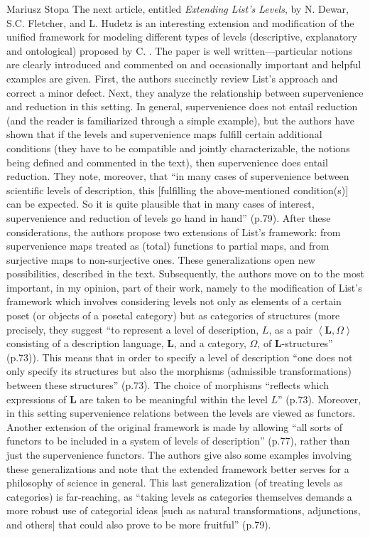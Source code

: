 \begin{recengenv}{Mariusz Stopa}
\enlargethispage{-.5\baselineskip}
The next article, entitled \textit{Extending List’s Levels}, by N. Dewar, S.C. Fletcher, and L. Hudetz is an interesting extension and modification of the unified framework for modeling different types of levels (descriptive, explanatory and ontological) proposed by C. \textcite{list_levels_2019}. The paper is well written---particular notions are clearly introduced and commented on and occasionally important and helpful examples are given. First, the authors succinctly review List's approach and correct a minor defect. Next, they analyze the relationship between supervenience and reduction in this setting. In general, supervenience does not entail reduction (and the reader is familiarized through a simple example), but the authors have shown that if the levels and supervenience maps fulfill certain additional conditions (they have to be compatible and jointly characterizable, the notions being defined and commented in the text), then supervenience does entail reduction. They note, moreover, that ``in many cases of supervenience between scientific levels of description, this [fulfilling the above-mentioned condition(s)] can be expected. So it is quite plausible that in many cases of interest, supervenience and reduction of levels go hand in hand'' (p.79). After these considerations, the authors propose two extensions of List's framework: from supervenience maps treated as (total) functions to partial maps, and from surjective maps to non-surjective ones. These generalizations open new possibilities, described in the text. Subsequently, the authors move on to the most important, in my opinion, part of their work, namely to the modification of List's framework which involves considering levels not only as elements of a certain poset (or objects of a posetal cat\-e\-go\-ry) but as cat\-e\-gories of structures (more precisely, they suggest ``to represent a level of description, $ L $, as a pair $ \left\langle \mathbf{L},\Omega\right\rangle  $ consisting of a description language, $ \mathbf{L} $, and a cat\-e\-go\-ry, $ \Omega $, of $\mathbf{L}$-structures'' (p.73)). This means that in order to specify a level of description ``one does not only specify its structures but also the morphisms (admissible transformations) between these structures'' (p.73). The choice of morphisms ``reflects which expressions of $ \mathbf{L} $ are taken to be meaningful within the level $ L $'' (p.73). Moreover, in this setting supervenience relations between the levels are viewed as functors. Another extension of the original framework is made by allowing ``all sorts of functors to be included in a system of levels of description'' (p.77), rather than just the supervenience functors. The authors give also some examples involving these generalizations and note that the extended framework better serves for a philosophy of science in general. This last generalization (of treating levels as cat\-e\-gories) is far-reaching, as ``taking levels as cat\-e\-gories themselves demands a more robust use of cat\-e\-go\-rial ideas [such as natural transformations, adjunctions, and others] that could also prove to be more fruitful'' (p.79).


\end{recengenv}
